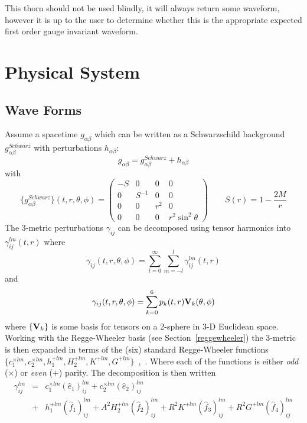 This thorn should not be used blindly, it will always return some
waveform, however it is up to the user to determine whether this is
the appropriate expected first order gauge invariant waveform.

\section{Physical System}

\subsection{Wave Forms}

Assume a spacetime $g_{\alpha\beta}$ which can be written as a Schwarzschild 
background $g_{\alpha\beta}^{Schwarz}$ with perturbations $h_{\alpha\beta}$:
%
\begin{equation}
g_{\alpha\beta} = g^{Schwarz}_{\alpha\beta} + h_{\alpha\beta}
\end{equation}
with
%
\begin{equation}
\{g^{Schwarz}_{\alpha\beta}\}(t,r,\theta,\phi) = 
\left( \begin{array}{cccc}
 -S & 0      & 0   & 0                \\
 0  & S^{-1} & 0   & 0                \\
 0  & 0      & r^2 & 0                \\
 0  & 0      & 0   & r^2 \sin^2\theta
\end{array}\right)
\qquad
S(r)=1-\frac{2M}{r}
\end{equation}
%
The 3-metric perturbations $\gamma_{ij}$ can be decomposed using tensor
harmonics into  $\gamma_{ij}^{lm}(t,r)$ where
$$
  \gamma_{ij}(t,r,\theta,\phi)=\sum_{l=0}^\infty \sum_{m=-l}^l
                       \gamma_{ij}^{lm}(t,r)
$$
%
and
%
$$
  \gamma_{ij}(t,r,\theta,\phi) = \sum_{k=0}^6 p_k(t,r) {\bf V}_k(\theta,\phi)
$$
where $\{{\bf V}_k\}$ is some basis for tensors on a 2-sphere
in 3-D Euclidean space.
%
%
%
Working with the Regge-Wheeler basis (see Section~\ref{reggewheeler})
the 3-metric is then expanded in terms of the (six) standard
Regge-Wheeler functions $\{c_1^{\times lm}, c_2^{\times lm},
h_1^{+lm}, H_2^{+lm}, K^{+lm},
G^{+lm}\}$~\cite{regge},~\cite{moncrief74}. Where each of the
functions is either {\it odd} ($\times$) or {\it even} ($+$)
parity. The decomposition is then written
%
\begin{eqnarray}
\gamma_{ij}^{lm} & = & c_1^{\times lm}(\hat{e}_1)_{ij}^{lm}
                   +   c_2^{\times lm}(\hat{e}_2)_{ij}^{lm} 
\nonumber\\
                 & + & h_1^{+lm}(\hat{f}_1)_{ij}^{lm} 
                   +   A^2 H_2^{+lm}(\hat{f}_2)_{ij}^{lm}
                   +   R^2 K^{+lm}(\hat{f}_3)_{ij}^{lm}
                   +   R^2 G^{+lm}(\hat{f}_4)_{ij}^{lm}
\end{eqnarray}
